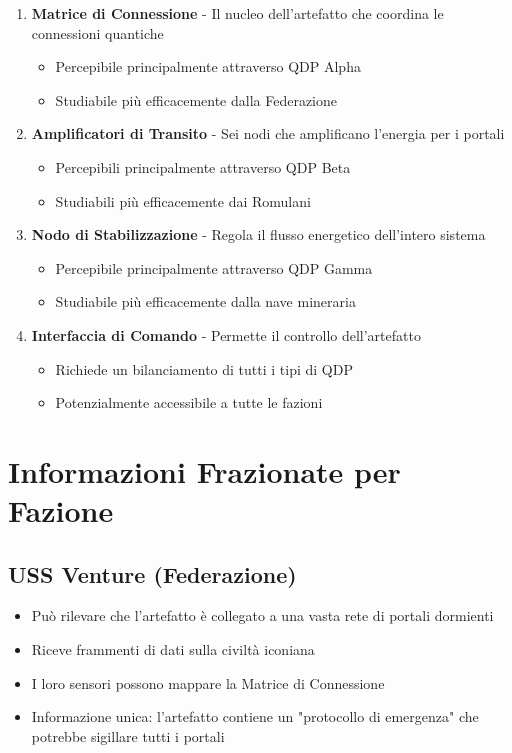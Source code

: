 \documentclass[letterpaper,twocolumn,openany,nodeprecatedcode]{dndbook}
\begin{document}
\begin{enumerate}
    \item \textbf{Matrice di Connessione} - Il nucleo dell'artefatto che coordina le connessioni quantiche
   \begin{itemize}
       \item Percepibile principalmente attraverso QDP Alpha
       \item Studiabile più efficacemente dalla Federazione
   \end{itemize}  

\item \textbf{Amplificatori di Transito} - Sei nodi che amplificano l'energia per i portali
\begin{itemize}
    \item Percepibili principalmente attraverso QDP Beta
   \item Studiabili più efficacemente dai Romulani
\end{itemize}

\item \textbf{Nodo di Stabilizzazione} - Regola il flusso energetico dell'intero sistema
\begin{itemize}
   \item Percepibile principalmente attraverso QDP Gamma
   \item Studiabile più efficacemente dalla nave mineraria
\end{itemize}

\item \textbf{Interfaccia di Comando} - Permette il controllo dell'artefatto
\begin{itemize}
   \item Richiede un bilanciamento di tutti i tipi di QDP
   \item Potenzialmente accessibile a tutte le fazioni
\end{itemize}
  
\end{enumerate}

\section{Informazioni Frazionate per Fazione}

\subsection{USS Venture (Federazione)}
\begin{itemize}
    \item Può rilevare che l'artefatto è collegato a una vasta rete di portali dormienti
    \item Riceve frammenti di dati sulla civiltà iconiana
    \item I loro sensori possono mappare la Matrice di Connessione
    \item Informazione unica: l'artefatto contiene un "protocollo di emergenza" che potrebbe sigillare tutti i portali
\end{itemize}
\end{document}
